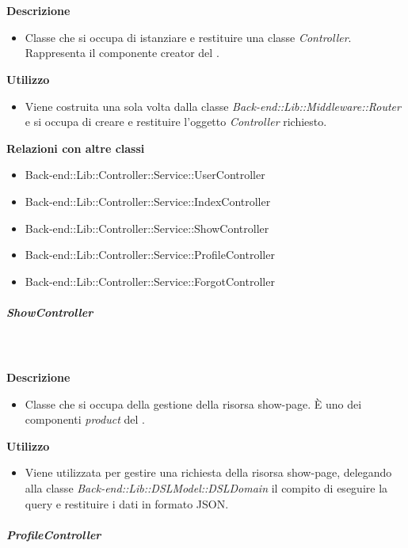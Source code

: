 				\textbf{\\ \\ Descrizione} 
					\begin{itemize}
						\item[] Classe che si occupa di istanziare e restituire una classe \textit{Controller}. Rappresenta il componente creator del  .
					\end{itemize}      
				\textbf{Utilizzo}  
					\begin{itemize}
						\item[] Viene costruita una sola volta dalla classe \textit{Back-end::Lib::Middleware::Router} e si occupa di creare e restituire l'oggetto \textit{Controller} richiesto.
					\end{itemize}
					\textbf{Relazioni con altre classi}
					\begin{itemize}
							\item{Back-end::Lib::Controller::Service::UserController}
							\item{Back-end::Lib::Controller::Service::IndexController}
							\item{Back-end::Lib::Controller::Service::ShowController}
							\item{Back-end::Lib::Controller::Service::ProfileController}
							\item{Back-end::Lib::Controller::Service::ForgotController}
					\end{itemize}
			\subparagraph{ShowController}
				
				\textbf{\\ \\ Descrizione} 
					\begin{itemize}
						\item[] Classe che si occupa della gestione della risorsa show-page. È uno dei componenti \textit{product} del  .
					\end{itemize}      
				\textbf{Utilizzo}  
					\begin{itemize}
						\item[] Viene utilizzata per gestire una richiesta della risorsa show-page, delegando alla classe \textit{Back-end::Lib::DSLModel::DSLDomain} il compito di eseguire la query e restituire i dati in formato JSON.
					\end{itemize}
			\subparagraph{ProfileController}
				
